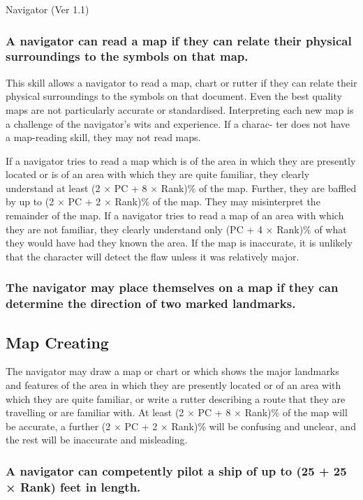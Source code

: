 \begin{Chapter}{Navigator (Ver 1.1)}
\subsubsection{A navigator can read a map if they can relate their physical
surroundings to the symbols on that map.}

This skill allows a navigator to read a map, chart or rutter if they
can relate their physical surroundings to the symbols on that
document.  Even the best quality maps are not particularly accurate or
standardised. Interpreting each new map is a challenge of the
navigator’s wits and experience. If a charac- ter does not have a
map-reading skill, they may not read maps.

If a navigator tries to read a map which is of the area in which they
are presently located or is of an area with which they are quite
familiar, they clearly understand at least (2 × PC + 8 × Rank)\% of
the map.  Further, they are baffled by up to (2 × PC + 2 × Rank)\% of
the map. They may misinterpret the remainder of the map.  If a
navigator tries to read a map of an area with which they are not
familiar, they clearly understand only (PC + 4 × Rank)\% of what they
would have had they known the area.  If the map is inaccurate, it is
unlikely that the character will detect the flaw unless it was
relatively major.

\subsubsection{The navigator may place themselves on a map if they can determine the direction of two marked landmarks.}

\subsection{Map Creating}

The navigator may draw a map or chart or which shows the major
landmarks and features of the area in which they are presently located
or of an area with which they are quite familiar, or write a rutter
describing a route that they are travelling or are familiar with. At
least (2 × PC + 8 × Rank)\% of the map will be accurate, a further (2
× PC + 2 × Rank)\% will be confusing and unclear, and the rest will be
inaccurate and misleading.

\subsubsection{A navigator can competently pilot a ship of up to (25 + 25 × Rank) feet in length.}


\end{Chapter}
